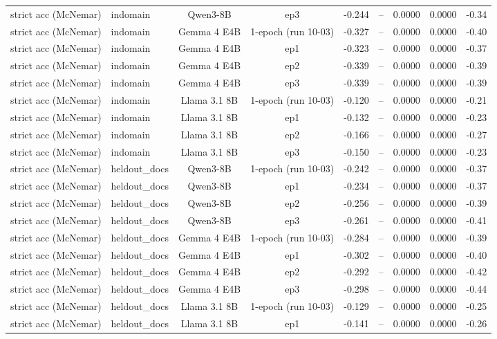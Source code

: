 \begin{table}[t]
{\begin{tabular}{llccccccc}
strict acc (McNemar) & indomain & Qwen3-8B & ep3 & -0.244 & – & 0.0000 & 0.0000 & -0.34 \\
strict acc (McNemar) & indomain & Gemma 4 E4B & 1-epoch (run 10-03) & -0.327 & – & 0.0000 & 0.0000 & -0.40 \\
strict acc (McNemar) & indomain & Gemma 4 E4B & ep1 & -0.323 & – & 0.0000 & 0.0000 & -0.37 \\
strict acc (McNemar) & indomain & Gemma 4 E4B & ep2 & -0.339 & – & 0.0000 & 0.0000 & -0.39 \\
strict acc (McNemar) & indomain & Gemma 4 E4B & ep3 & -0.339 & – & 0.0000 & 0.0000 & -0.39 \\
strict acc (McNemar) & indomain & Llama 3.1 8B & 1-epoch (run 10-03) & -0.120 & – & 0.0000 & 0.0000 & -0.21 \\
strict acc (McNemar) & indomain & Llama 3.1 8B & ep1 & -0.132 & – & 0.0000 & 0.0000 & -0.23 \\
strict acc (McNemar) & indomain & Llama 3.1 8B & ep2 & -0.166 & – & 0.0000 & 0.0000 & -0.27 \\
strict acc (McNemar) & indomain & Llama 3.1 8B & ep3 & -0.150 & – & 0.0000 & 0.0000 & -0.23 \\
strict acc (McNemar) & heldout\_docs & Qwen3-8B & 1-epoch (run 10-03) & -0.242 & – & 0.0000 & 0.0000 & -0.37 \\
strict acc (McNemar) & heldout\_docs & Qwen3-8B & ep1 & -0.234 & – & 0.0000 & 0.0000 & -0.37 \\
strict acc (McNemar) & heldout\_docs & Qwen3-8B & ep2 & -0.256 & – & 0.0000 & 0.0000 & -0.39 \\
strict acc (McNemar) & heldout\_docs & Qwen3-8B & ep3 & -0.261 & – & 0.0000 & 0.0000 & -0.41 \\
strict acc (McNemar) & heldout\_docs & Gemma 4 E4B & 1-epoch (run 10-03) & -0.284 & – & 0.0000 & 0.0000 & -0.39 \\
strict acc (McNemar) & heldout\_docs & Gemma 4 E4B & ep1 & -0.302 & – & 0.0000 & 0.0000 & -0.40 \\
strict acc (McNemar) & heldout\_docs & Gemma 4 E4B & ep2 & -0.292 & – & 0.0000 & 0.0000 & -0.42 \\
strict acc (McNemar) & heldout\_docs & Gemma 4 E4B & ep3 & -0.298 & – & 0.0000 & 0.0000 & -0.44 \\
strict acc (McNemar) & heldout\_docs & Llama 3.1 8B & 1-epoch (run 10-03) & -0.129 & – & 0.0000 & 0.0000 & -0.25 \\
strict acc (McNemar) & heldout\_docs & Llama 3.1 8B & ep1 & -0.141 & – & 0.0000 & 0.0000 & -0.26 \\

\end{tabular}}
\end{table}
